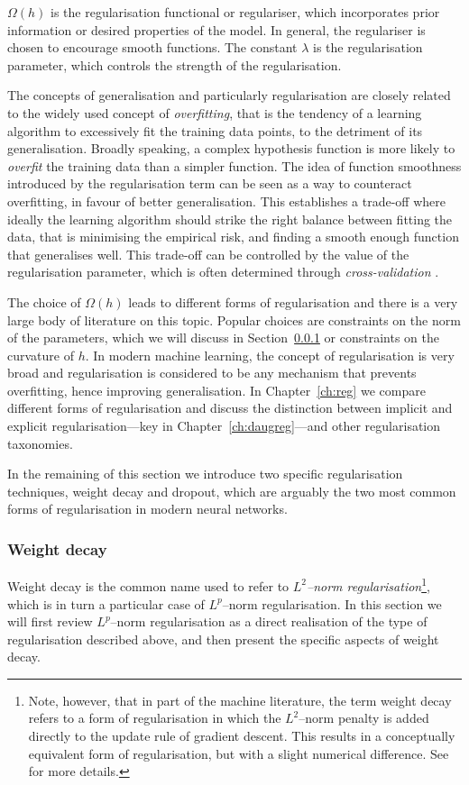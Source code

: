 {$\Omega(h)$ is the regularisation functional or regulariser, which incorporates prior information or desired properties of the model. In general, the regulariser is chosen to encourage smooth functions. The constant $\lambda$ is the regularisation parameter, which controls the strength of the regularisation. 

The concepts of generalisation and particularly regularisation are closely related to the widely used concept of \textit{overfitting}, that is the tendency of a learning algorithm to excessively fit the training data points, to the detriment of its generalisation. Broadly speaking, a complex hypothesis function is more likely to \textit{overfit} the training data than a simpler function. The idea of function smoothness introduced by the regularisation term can be seen as a way to counteract overfitting, in favour of better generalisation. This establishes a trade-off where ideally the learning algorithm should strike the right balance between fitting the data, that is minimising the empirical risk, and finding a smooth enough function that generalises well. This trade-off can be controlled by the value of the regularisation parameter, which is often determined through \textit{cross-validation} \citep{stone1974crossval, allen1974crossval}. 

The choice of $\Omega(h)$ leads to different forms of regularisation and there is a very large body of literature on this topic. Popular choices are constraints on the norm of the parameters, which we will discuss in Section~\ref{sec:background-weight_decay} or constraints on the curvature of $h$. In modern machine learning, the concept of regularisation is very broad and regularisation is considered to be any mechanism that prevents overfitting, hence improving generalisation. In Chapter~\ref{ch:reg} we compare different forms of regularisation and discuss the distinction between implicit and explicit regularisation---key in Chapter~\ref{ch:daugreg}---and other regularisation taxonomies.

In the remaining of this section we introduce two specific regularisation techniques, weight decay and dropout, which are arguably the two most common forms of regularisation in modern neural networks.

\subsubsection{Weight decay}
\label{sec:background-weight_decay}
Weight decay is the common name used to refer to \textit{$L^2$--norm regularisation}\footnote{Note, however, that in part of the machine literature, the term weight decay refers to a form of regularisation in which the $L^2$--norm penalty is added directly to the update rule of gradient descent. This results in a conceptually equivalent form of regularisation, but with a slight numerical difference. See \citet{babenko2018wdvsl2} for more details.}, which is in turn a particular case of $L^p$--norm regularisation. In this section we will first review $L^p$--norm regularisation as a direct realisation of the type of regularisation described above, and then present the specific aspects of weight decay.

}
